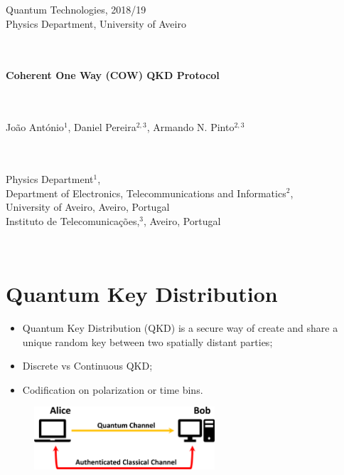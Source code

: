 \documentclass[1000pt]{article}
\newcommand{\mysection}[1]{\section*{\color{black}\sffamily #1}}%
\begin{document}
\begin{titlepage}  

\color{itblue} \sffamily \noindent \normalsize
\hspace*{4cm} Quantum Technologies, 2018/19\\
\hspace*{4cm} Physics Department, University of Aveiro\\
\\
\\
\hspace*{6.5cm}\begin{minipage}{15in}
\vspace*{2cm}
\begin{flushleft}
 \color{title} \sffamily \noindent \Huge
\textbf{Coherent One Way (COW) QKD Protocol}
\end{flushleft}
\end{minipage}
\vspace*{2cm}\\
\\
\hspace*{6.5cm}
\color{author}
\Large João António$^1$, Daniel Pereira$^{2,3}$, Armando N. Pinto$^{2,3}$\\
\\
\vspace*{2cm}\\
\hspace*{6.5cm}
\begin{minipage}{12cm}
\color{title}
\large Physics Department$^1$,\\
Department of Electronics, Telecommunications and Informatics$^2$,\\
University of Aveiro, Aveiro, Portugal\\
Instituto de Telecomunica\c{c}\~{o}es,$^3$, Aveiro, Portugal
\end{minipage}\


\end{titlepage}


\mysection{\Huge\textbf{ Quantum Key Distribution}} \Large \vspace*{1cm}
\begin{itemize}
\item Quantum Key Distribution (QKD) is a secure way of create and share a unique random key between two spatially distant parties;
\item Discrete vs Continuous QKD;
\item Codification on polarization or time bins.
\end{itemize}
  \begin{figure}[hbt]
    	\centering
    	\includegraphics[width=0.6\textwidth]{./figures/Full.pdf}
    \end{figure}
       
\end{document}
